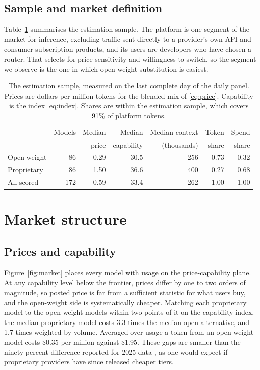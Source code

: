 \documentclass{article}
\newcommand{\CovScored}{91}
\newcommand{\MatchedRatio}{3.3}
\newcommand{\MatchedWeighted}{1.7}
\newcommand{\RealisedOpen}{0.35}
\newcommand{\RealisedClosed}{1.95}
\begin{document}
\subsection{Sample and market definition}

Table~\ref{tab:summary} summarises the estimation sample. The platform is
one segment of the market for inference, excluding traffic sent directly to a provider's own
API and consumer subscription products, and its users are developers who have chosen a
router. That selects for price sensitivity and willingness to switch, so the segment we
observe is the one in which open-weight substitution is easiest.

\begin{table}[H]
\caption{The estimation sample, measured on the last complete day of the daily panel. Prices
are dollars per million tokens for the blended mix of \eqref{eq:price}. Capability is the
index \eqref{eq:index}. Shares are within the estimation sample, which covers \CovScored\% of
platform tokens.}
\label{tab:summary}
\centering
\small
\begin{tabular}{lrrrrrr}
\toprule
& Models & Median & Median & Median context & Token & Spend \\
& & price & capability & (thousands) & share & share \\
\midrule
Open-weight   & 86 & 0.29 & 30.5 & 256 & 0.73 & 0.32 \\
Proprietary   & 86 & 1.50 & 36.6 & 400 & 0.27 & 0.68 \\
\midrule
All scored    & 172 & 0.59 & 33.4 & 262 & 1.00 & 1.00 \\
\bottomrule
\end{tabular}
\end{table}

\section{Market structure}

\subsection{Prices and capability}

Figure~\ref{fig:market} places every model with usage on the price-capability plane. At any
capability level below the frontier, prices differ by one to two orders of magnitude, so posted
price is far from a sufficient statistic for what users buy, and the open-weight side is
systematically cheaper. Matching each proprietary model to the open-weight models within two
points of it on the capability index, the median proprietary model costs \MatchedRatio{} times
the median open alternative, and \MatchedWeighted{} times weighted by volume. Averaged over
usage a token from an open-weight model costs \$\RealisedOpen{} per million against
\$\RealisedClosed{}. These gaps are smaller than the ninety percent difference reported for
2025 data \citep{demirer2025,nagle2025}, as one would expect if proprietary providers have
since released cheaper tiers.
\end{document}
